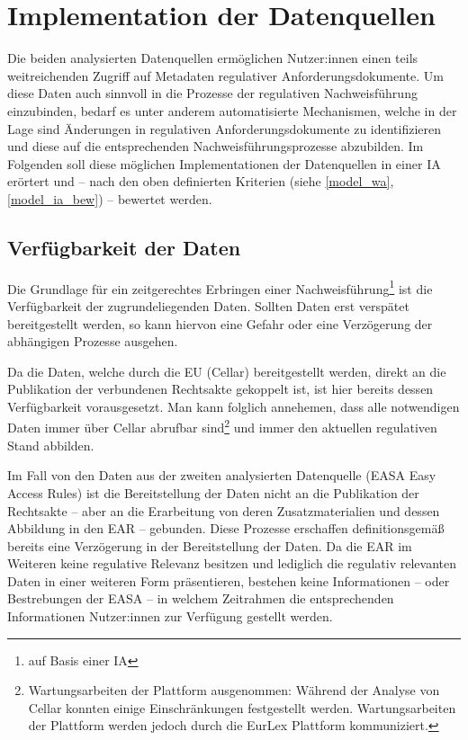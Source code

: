 
\chapter{Implementation der Datenquellen} \label{anal}


    Die beiden analysierten Datenquellen ermöglichen Nutzer:innen einen teils weitreichenden Zugriff auf Metadaten regulativer Anforderungsdokumente.
    Um diese Daten auch sinnvoll in die Prozesse der regulativen Nachweisführung einzubinden, bedarf es unter anderem automatisierte Mechanismen, welche in der Lage sind Änderungen in regulativen Anforderungsdokumente zu identifizieren und diese auf die entsprechenden Nachweisführungsprozesse abzubilden.
    Im Folgenden soll diese möglichen Implementationen der Datenquellen in einer \acf{IA} erörtert und -- nach den oben definierten Kriterien (siehe \ref{model_wa}, \ref{model_ia_bew}) -- bewertet werden.

    \section{Verfügbarkeit der Daten}

    Die Grundlage für ein zeitgerechtes Erbringen einer Nachweisführung\footnote{auf Basis einer \ac{IA}} ist die Verfügbarkeit der zugrundeliegenden Daten.
    Sollten Daten erst verspätet bereitgestellt werden, so kann hiervon eine Gefahr oder eine Verzögerung der abhängigen Prozesse ausgehen.

    \medskip
    Da die Daten, welche durch die \ac{EU} (Cellar) bereitgestellt werden, direkt an die Publikation der verbundenen Rechtsakte gekoppelt ist, ist hier bereits dessen Verfügbarkeit vorausgesetzt.
    Man kann folglich annehemen, dass alle notwendigen Daten immer über Cellar abrufbar sind\footnote{Wartungsarbeiten der Plattform ausgenommen: Während der Analyse von Cellar konnten einige Einschränkungen festgestellt werden. Wartungsarbeiten der Plattform werden jedoch durch die EurLex Plattform kommuniziert.} und immer den aktuellen regulativen Stand abbilden.

    \medskip
    Im Fall von den Daten aus der zweiten analysierten Datenquelle (\ac{EASA} Easy Access Rules) ist die Bereitstellung der Daten nicht an die Publikation der Rechtsakte -- aber an die Erarbeitung von deren Zusatzmaterialien und dessen Abbildung in den \ac{EAR} -- gebunden.
    Diese Prozesse erschaffen definitionsgemäß bereits eine Verzögerung in der Bereitstellung der Daten.
    Da die \ac{EAR} im Weiteren keine regulative Relevanz besitzen und lediglich die regulativ relevanten Daten in einer weiteren Form präsentieren, bestehen keine Informationen -- oder Bestrebungen der \ac{EASA} \cite{easa_xml_export} -- in welchem Zeitrahmen die entsprechenden Informationen Nutzer:innen zur Verfügung gestellt werden.    

